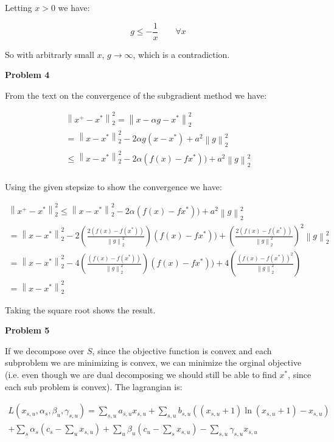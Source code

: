 \documentclass{article}
\newcommand{\norm}[1]{\left\lVert#1\right\rVert}
\begin{document}
Letting $x > 0$ we have:

$$g \leq -\frac{1}{x} \qquad \forall x$$

So with arbitrarly small $x$, $g \rightarrow \infty$, which is a contradiction.

\newpage


\noindent\textbf{Problem 4}

\noindent From the text on the convergence of the subgradient method we have:

\begin{gather*}
  \norm{x^+ - x^*}_2^2 = \norm{x- \alpha g - x^*}_2^2\\
  =  \norm{x - x^*}_2^2 - 2 \alpha g (x - x^*) + a^2\norm{g}_2^2 \\
  \leq  \norm{x - x^*}_2^2 - 2 \alpha (f(x) - fx^*)) + a^2\norm{g}_2^2\\
\end{gather*}

\noindent Using the given stepsize to show the convergence we have:

\begin{gather*}
  \norm{x^+ - x^*}_2^2 \leq  \norm{x - x^*}_2^2 - 2 \alpha (f(x) - fx^*)) + a^2\norm{g}_2^2\\
  =  \norm{x - x^*}_2^2 - 2 \left(\frac{2(f(x) - f(x^*))}{\norm{g}_2^2}\right) (f(x) - fx^*)) +  \left(\frac{2(f(x) - f(x^*))}{\norm{g}_2^2}\right)^2\norm{g}_2^2\\
 =\norm{x - x^*}_2^2 - 4 \left(\frac{(f(x) - f(x^*))}{\norm{g}_2^2}\right) (f(x) - fx^*)) + 4 \left(\frac{(f(x) - f(x^*))^2}{\norm{g}_2^2}\right)\\
  =  \norm{x - x^*}_2^2
\end{gather*}

\noindent Taking the square root shows the result.

\vspace{3mm}

\noindent\textbf{Problem 5}

If we decompose over $S$, since the objective function is convex and each subproblem we are minimizing is convex, we can minimize the orginal objective (i.e. even though we are dual decomposing we should still be able to find $x^*$, since each sub problem is convex). The lagrangian is:

\begin{gather*}
 L(x_{s,u}, \alpha_s, \beta_u, \gamma_{s,u}) = \sum_{s,u} a_{s,u}x_{s,u} + \sum_{s,u}b_{s,u}((x_{s,u}+1)\ln(x_{s,u} + 1) - x_{s,u})\\
  + \sum_s \alpha_s(c_s - \sum_u x_{s,u}) + \sum_u \beta_u (c_u - \sum_s x_{s,u}) - \sum_{s,u} \gamma_{s,u} x_{s,u}\\
\end{gather*}
\end{document}

